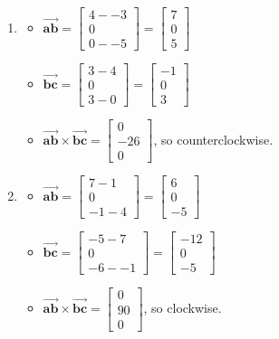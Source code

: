 \documentclass[11pt]{article}
\begin{document}
\begin{enumerate}[a.]
\begin{enumerate}[1.)]
		\item %
		\begin{itemize}
			\item $\vec{\textbf{ab}} = 
			\begin{bmatrix}
				4--3 \\ 0 \\ 0--5
			\end{bmatrix}=
			\begin{bmatrix}
				7 \\ 0 \\ 5
			\end{bmatrix}$
			\item $\vec{\textbf{bc}} = 
			\begin{bmatrix}
				3-4 \\ 0 \\ 3-0
			\end{bmatrix}=
			\begin{bmatrix}
				-1 \\ 0 \\ 3
			\end{bmatrix}$
			\item $\vec{\textbf{ab}}\times\vec{\textbf{bc}} = 
			\begin{bmatrix}
				0 \\ -26 \\ 0
			\end{bmatrix}$, so counterclockwise.
		\end{itemize}
		
		\item %
		\begin{itemize}
			\item $\vec{\textbf{ab}} = 
			\begin{bmatrix}
				7-1 \\ 0 \\ -1-4
			\end{bmatrix}=
			\begin{bmatrix}
				6 \\ 0 \\ -5
			\end{bmatrix}$
			\item $\vec{\textbf{bc}} = 
			\begin{bmatrix}
				-5-7 \\ 0 \\ -6--1
			\end{bmatrix}=
			\begin{bmatrix}
				-12 \\ 0 \\ -5
			\end{bmatrix}$
			\item $\vec{\textbf{ab}}\times\vec{\textbf{bc}} = 
			\begin{bmatrix}
				0 \\ 90 \\ 0
			\end{bmatrix}$, so clockwise.
		\end{itemize}
		

\end{enumerate}
\end{enumerate}
\end{document}
